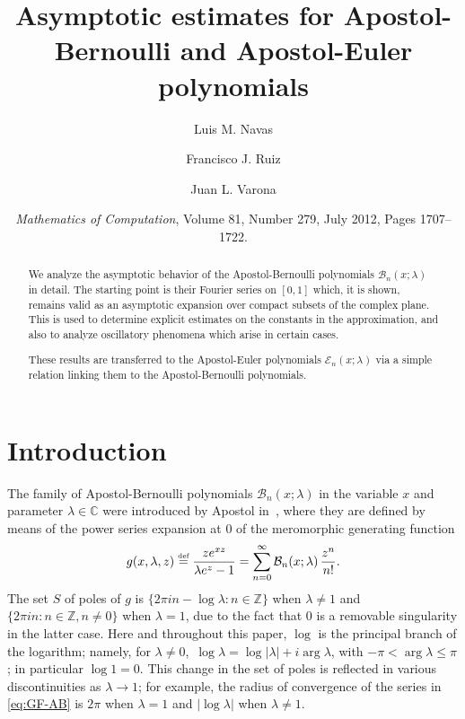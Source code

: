 \documentclass[11pt,a4paper]{amsart}
\date{\textit{Mathematics of Computation}, Volume 81, Number 279, July 2012, Pages 1707--1722.}
\title[Estimates for Apostol-Bernoulli and Apostol-Euler polynomials]%
{Asymptotic estimates for Apostol-Bernoulli and Apostol-Euler polynomials}
\author[L.~M.~Navas]{Luis M. Navas}
\author[F.~J.~Ruiz]{Francisco J. Ruiz}
\author[J.~L.~Varona]{Juan L. Varona}
\newcommand{\Z}{\mathbb{Z}}
\newcommand{\C}{\mathbb{C}}
\newcommand{\B}{\mathcal{B}}
\newcommand{\E}{\mathcal{E}}
\theoremstyle{plain}
\theoremstyle{remark}
\begin{document}

\maketitle


\begin{abstract}
	We analyze the asymptotic behavior of the Apostol-Bernoulli polynomials
	$\B_{n}(x;\lambda)$ in detail. The starting point is their Fourier series on $[0,1]$
	which, it is shown, remains valid as an asymptotic expansion 
	over compact subsets of the complex plane.
	This is used to determine explicit estimates on the constants in the approximation, and 
	also to analyze oscillatory phenomena which arise in certain cases.

	These results are transferred to the Apostol-Euler polynomials $\E_{n}(x;\lambda)$
	via a simple relation linking them to the Apostol-Bernoulli polynomials.
\end{abstract}


\section{Introduction}\label{sec:intro}


The family of Apostol-Bernoulli polynomials $\B_{n}(x;\lambda)$ in the variable $x$ and parameter $\lambda \in \C$ were introduced by Apostol in~\cite{Ap}, where they are defined by means of the power series expansion at $0$ of the meromorphic generating function
%
\begin{equation}
\label{eq:GF-AB}
  g(x,\lambda,z) \stackrel{\text{\tiny def}}{=} \frac{z e^{xz}}{\lambda e^z-1} = \sum_{n=0}^\infty \B_n(x;\lambda)\, \frac{z^n}{n!}.
\end{equation}
%
The set $S$ of poles of $g$ is $\{ 2\pi i n - \log\lambda : n \in \Z\}$ when $\lambda \neq 1$ and $\{ 2 \pi i n : n \in \Z, n \neq 0 \}$ when $\lambda = 1$, due to the fact that $0$ is a removable singularity in the latter case. Here and throughout this paper, $\log$ is the principal branch of the logarithm; namely, for $\lambda \neq 0$,\ $\log\lambda = \log |\lambda| + i \arg \lambda$, with $-\pi < \arg \lambda \le \pi$; in particular $\log 1 = 0$. 
This change in the set of poles is reflected in various discontinuities as $\lambda \to 1$; for example, the radius of convergence of the series in \eqref{eq:GF-AB} is $2\pi$ when $\lambda = 1$ and $|\log \lambda|$ when $\lambda \neq 1$.
\end{document}
